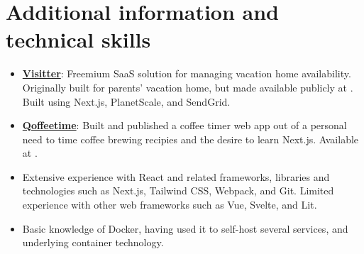 \documentclass[10pt]{article}
\begin{document}
\section{Additional information and technical skills}
\label{sec:other}

\begin{itemize}
    \item \textbf{\underline{Visitter}}: Freemium SaaS solution for managing vacation home availability. Originally built for parents' vacation home, but made available publicly at . Built using Next.js, PlanetScale, and SendGrid.
    \item \textbf{\underline{Qoffeetime}}: Built and published a coffee timer web app out of a personal need to time coffee brewing recipies and the desire to learn Next.js. Available at .
    \item Extensive experience with React and related frameworks, libraries and technologies such as Next.js, Tailwind CSS, Webpack, and Git. Limited experience with other web frameworks such as Vue, Svelte, and Lit.
    \item Basic knowledge of Docker, having used it to self-host several services, and underlying container technology.
\end{itemize}
\end{document}
